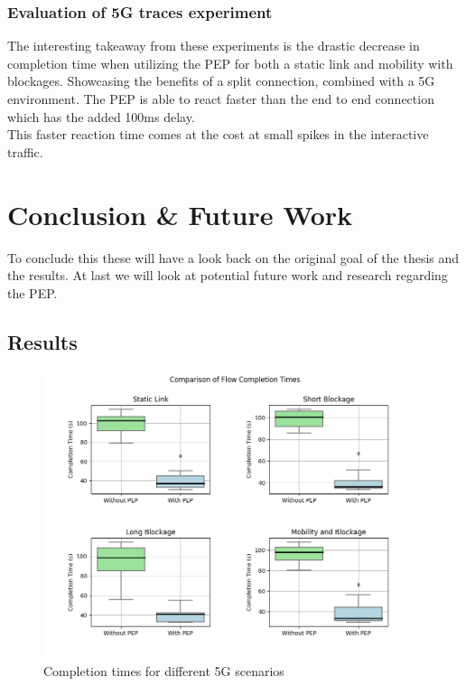 \documentclass[a4paper,english, 11pt]{report}
\begin{document}
\subsection{Evaluation of 5G traces experiment}

The interesting takeaway from these experiments is the drastic decrease in completion time when utilizing the PEP for both a static link and mobility with blockages. Showcasing the benefits of a split connection, combined with a 5G environment. The PEP is able to react faster than the end to end connection which has the added 100ms delay.\\

This faster reaction time comes at the cost at small spikes in the interactive traffic.

\chapter{Conclusion \& Future Work}
To conclude this these will have a look back on the original goal of the thesis and the results. At last we will look at potential future work and research regarding the PEP.

\section{Results}

\begin{figure}[h!] %
	\centering
	\includegraphics[scale=0.50]{../diagrams/witestlab/fcts.png}
  	\caption{Completion times for different 5G scenarios}
  	\label{fig:sb_ultra}
\end{figure}
\end{document}
